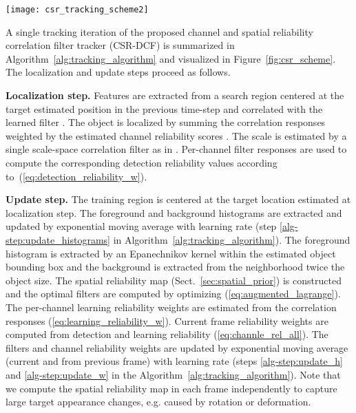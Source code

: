 \documentclass[twocolumn]{article}
\begin{document}
\begin{figure*}[!t]
\centering
\texttt{[image: csr\_tracking\_scheme2]}
\caption{The CSR-DCF tracking iteration: localization step is shown on the left and update step on the right side of the image.}
\label{fig:csr_scheme}
\end{figure*}
A single tracking iteration of the proposed channel and spatial reliability correlation filter tracker (CSR-DCF) is summarized in Algorithm~\ref{alg:tracking_algorithm} and visualized in Figure~\ref{fig:csr_scheme}. The localization and update steps proceed as follows.

\textbf{Localization step.} Features are extracted from a search region centered at the target estimated position in the previous time-step and correlated with the learned filter . The object is localized by summing the correlation responses weighted by the estimated channel reliability scores . The scale is estimated by a single scale-space correlation filter as in \cite{danelljan2014accurate}. Per-channel filter responses are used to compute the corresponding detection reliability values  according to~(\ref{eq:detection_reliability_w}).

\textbf{Update step.} The training region is centered at the target location estimated at localization step. The foreground and background histograms  are extracted and updated by exponential moving average with learning rate  (step \ref{alg-step:update_histograms} in Algorithm~\ref{alg:tracking_algorithm}). The foreground histogram is extracted by an Epanechnikov kernel within the estimated object bounding box and the background is extracted from the neighborhood twice the object size. The spatial reliability map  (Sect.~\ref{sec:spatial_prior}) is constructed and the optimal filters  are computed by optimizing (\ref{eq:augmented_lagrange}). The per-channel learning reliability weights  are estimated from the correlation responses (\ref{eq:learning_reliability_w}). Current frame reliability weights  are computed from detection and learning reliability (\ref{eq:channle_rel_all}). The filters and channel reliability weights are updated by exponential moving average (current and from previous frame) with learning rate  (steps \ref{alg-step:update_h} and \ref{alg-step:update_w} in the Algorithm~\ref{alg:tracking_algorithm}). Note that we compute the spatial reliability map in each frame independently to capture large target appearance changes, e.g. caused by rotation or deformation.
\end{document}
